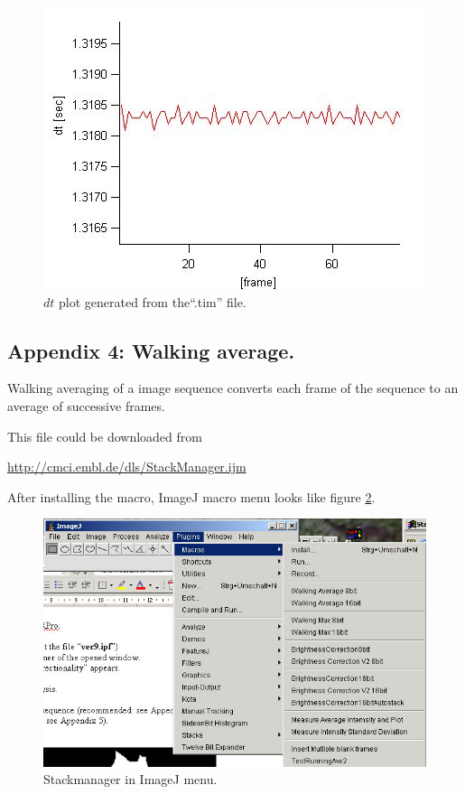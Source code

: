 \documentclass{article}
\begin{document}
\begin{figure}[!ht]
\centering
\includegraphics[scale=0.4]{img/image054.jpg}
\caption{$dt$ plot generated from the``.tim'' file.}
\label{fig:dtplot}
\end{figure}


\subsection{Appendix 4: Walking average.}

Walking averaging of a image sequence converts each frame of the
sequence to an average of successive frames.

This file could be downloaded from

\url{http://cmci.embl.de/dls/StackManager.ijm}

After installing the macro, ImageJ macro menu looks like figure \ref{fig:stackmanagerMenu}.

\begin{figure}[!ht]
\centering
\includegraphics[scale=0.4]{img/StackmanagerMenu.jpg}
\caption{Stackmanager in ImageJ menu.}
\label{fig:stackmanagerMenu}
\end{figure}
\end{document}
